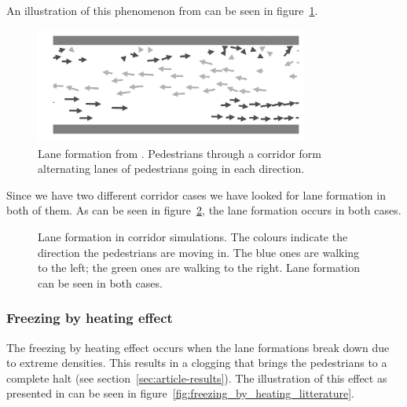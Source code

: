 An illustration of this phenomenon from \cite{lanes} can be seen in 
figure~\ref{fig:lanes-literature}. 

\begin{figure}[h]
    \centering
    \includegraphics[width=0.8\textwidth]{Figures/flow_lanes_litterature.png}
    \caption[Lane formation from \cite{lanes}]{Lane formation from 
    \cite{lanes}. Pedestrians through a corridor form alternating lanes of 
    pedestrians going in each direction.}
    \label{fig:lanes-literature}
\end{figure}

Since we have two different corridor cases we have looked for lane
formation in both of them. As can be seen in figure~\ref{fig:laneformation}, 
the lane formation occurs in both cases.

\begin{figure}[h]
    \centering
    \caption[Lane formation in corridor simulations]{Lane formation in 
    corridor simulations. The colours indicate the direction the pedestrians 
    are moving in. The blue ones are walking to the left; the green ones are 
    walking to the right. Lane formation can be seen in both cases. }
    \label{fig:laneformation}
\end{figure}

\subsubsection{Freezing by heating effect}
The freezing by heating effect occurs when the lane formations break down due 
to extreme densities. This results in a clogging that brings the pedestrians 
to a complete halt (see section~\ref{sec:article-results}).  The illustration 
of this effect as presented in \cite{oscil} can be seen in 
figure~\ref{fig:freezing_by_heating_litterature}.

